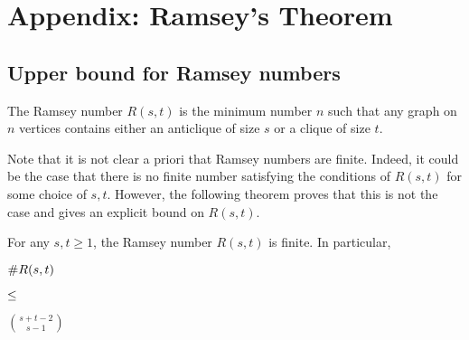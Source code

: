 \documentclass[scombinatorics.tex]{subfiles}
\begin{document}
\chapter{Appendix: Ramsey's Theorem}\label{ramsey}

\def\medrel#1{\parbox[t]{5ex}{$\displaystyle\hfil #1$}}
\def\ceq#1#2#3{\parbox[t]{20ex}{$\displaystyle #1$}\medrel{#2}{$\displaystyle #3$}}

\section{Upper bound for Ramsey numbers}

\begin{definition}
  The Ramsey number $R(s,t)$ is the minimum number $n$ such that any graph on $n$ vertices contains either an anticlique of size $s$ or a clique of size $t$.\QED
\end{definition}

Note that it is not clear a priori that Ramsey numbers are finite.
Indeed, it could be the case that there is no finite number satisfying the conditions of $R(s, t)$ for some choice of $s, t$. 
However, the following theorem proves that this is not the case and gives an explicit bound on $R(s, t)$.

\begin{theorem}
  For any $s, t \ge 1$, the Ramsey number $R(s, t)$ is finite.
  In particular,

  \ceq{\#\hfill R(s,t)}{\le}{\binom{s+t-2}{s-1}}
\end{theorem}
\end{document}
